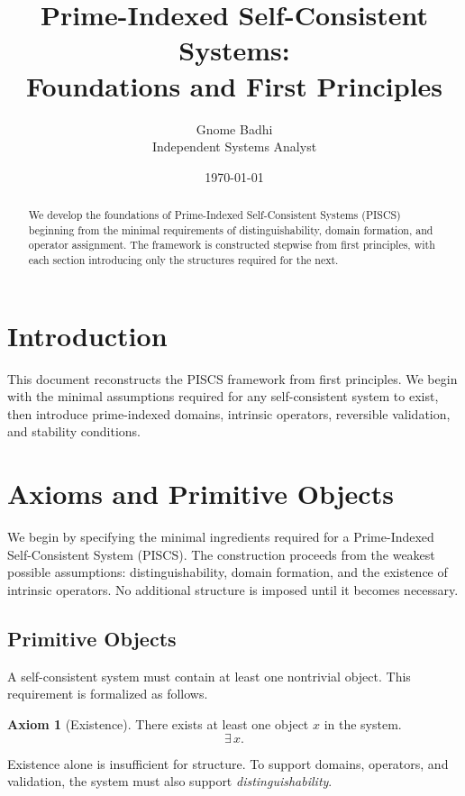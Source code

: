 \documentclass[11pt]{article}
\title{Prime-Indexed Self-Consistent Systems:\\
Foundations and First Principles}
\author{Gnome Badhi\\
{\small Independent Systems Analyst}}
\date{\today}
\theoremstyle{definition}
\newtheorem{axiom}{Axiom}[section]
\theoremstyle{plain}
\theoremstyle{remark}
\begin{document}
\maketitle

\begin{abstract}
We develop the foundations of Prime-Indexed Self-Consistent Systems (PISCS)
beginning from the minimal requirements of distinguishability, domain formation,
and operator assignment. The framework is constructed stepwise from first
principles, with each section introducing only the structures required for the
next.
\end{abstract}

\section{Introduction}

This document reconstructs the PISCS framework from first principles. We begin
with the minimal assumptions required for any self-consistent system to exist,
then introduce prime-indexed domains, intrinsic operators, reversible
validation, and stability conditions.

\section{Axioms and Primitive Objects}

We begin by specifying the minimal ingredients required for a
Prime-Indexed Self-Consistent System (PISCS). The construction proceeds
from the weakest possible assumptions: distinguishability, domain
formation, and the existence of intrinsic operators. No additional
structure is imposed until it becomes necessary.

\subsection{Primitive Objects}

A self-consistent system must contain at least one nontrivial object.
This requirement is formalized as follows.

\begin{axiom}[Existence]
There exists at least one object $x$ in the system.
\[
\exists\, x.
\]
\end{axiom}

Existence alone is insufficient for structure. To support domains,
operators, and validation, the system must also support
\emph{distinguishability}.
\end{document}
